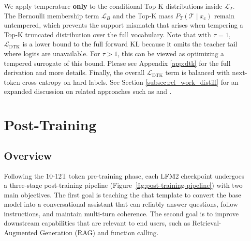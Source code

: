 \documentclass{article}
\begin{document}
We apply temperature \textbf{only} to the conditional Top-K distributions inside $\mathcal L_T$. The Bernoulli membership term $\mathcal L_B$ and the Top-K mass $P_T(\mathcal T\mid x_c)$ remain untempered, which prevents the support mismatch that arises when tempering a Top-K truncated distribution over the full vocabulary. Note that with $\tau=1$, $\mathcal L_{\text{DTK}}$ is a lower bound to the full forward KL because it omits the teacher tail where logits are unavailable. For $\tau > 1$, this can be viewed as optimizing a tempered surrogate of this bound. Please see Appendix \ref{app:dtk} for the full derivation and more details. Finally, the overall $\mathcal L_{\text{DTK}}$ term is balanced with next-token cross-entropy on hard labels. See Section \ref{subsec:rel_work_distill} for an expanded discussion on related approaches such as \citet{zhao2022decoupled} and \citet{anshumann2025sparse}.


\section{Post-Training}
\label{sec:post_training}

\subsection{Overview}
Following the 10-12T token pre-training phase, each LFM2 checkpoint undergoes a three-stage post-training pipeline (Figure~\ref{fig:post-training-pipeline}) with two main objectives. The first goal is teaching the chat template to convert the base model into a conversational assistant that can reliably answer questions, follow instructions, and maintain multi-turn coherence. The second goal is to improve downstream capabilities that are relevant to end users, such as Retrieval-Augmented Generation (RAG) and function calling.
\end{document}

